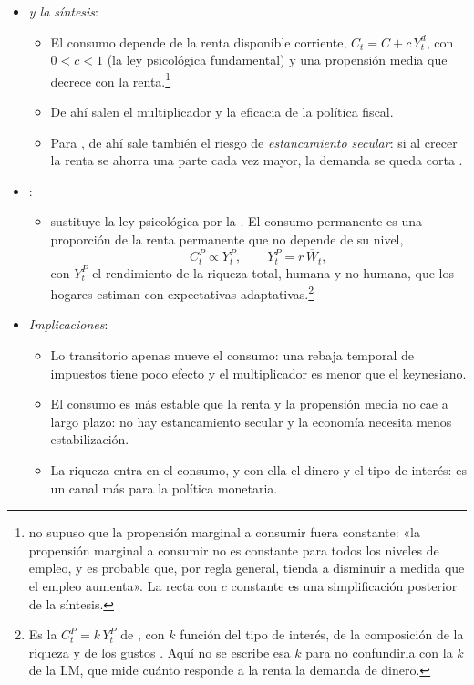 \documentclass[11pt]{article}
\begin{document}
\begin{itemize}
\item \emph{ y la síntesis}:
  \begin{itemize}
  \item El consumo depende de la renta disponible corriente, $C_t=\overline{C}+c\,Y^d_t$, con $0<c<1$ (la ley psicológica fundamental) y una propensión media que decrece con la renta.\footnote{ no supuso que la propensión marginal a consumir fuera constante: «la propensión marginal a consumir no es constante para todos los niveles de empleo, y es probable que, por regla general, tienda a disminuir a medida que el empleo aumenta»\nocite{Keynes1936}. La recta con $c$ constante es una simplificación posterior de la síntesis.}
  \item De ahí salen el multiplicador y la eficacia de la política fiscal.
  \item Para , de ahí sale también el riesgo de \emph{estancamiento secular}: si al crecer la renta se ahorra una parte cada vez mayor, la demanda se queda corta\nocite{Hansen1939Economic} .
  \end{itemize}
\item \emph{}:
  \begin{itemize}
  \item \textcite{Friedman1957} sustituye la ley psicológica por la . El consumo permanente es una proporción de la renta permanente que no depende de su nivel,
  \begin{equation}
  C^P_t\propto Y^P_t,\qquad Y^P_t=r\,\overline{W}_t, \label{eq:renta-permanente}
  \end{equation}
  con $Y^P_t$ el rendimiento de la riqueza total, humana y no humana, que los hogares estiman con expectativas adaptativas.\footnote{Es la $C^P_t=k\,Y^P_t$ de \textcite{Friedman1957}, con $k$ función del tipo de interés, de la composición de la riqueza y de los gustos . Aquí no se escribe esa $k$ para no confundirla con la $k$ de la LM, que mide cuánto responde a la renta la demanda de dinero.}
  \end{itemize}
\item \emph{Implicaciones}:
  \begin{itemize}
  \item Lo transitorio apenas mueve el consumo: una rebaja temporal de impuestos tiene poco efecto y el multiplicador es menor que el keynesiano.
  \item El consumo es más estable que la renta y la propensión media no cae a largo plazo: no hay estancamiento secular y la economía necesita menos estabilización.
  \item La riqueza entra en el consumo, y con ella el dinero y el tipo de interés: es un canal más para la política monetaria.
  \end{itemize}
\end{itemize}
\end{document}
